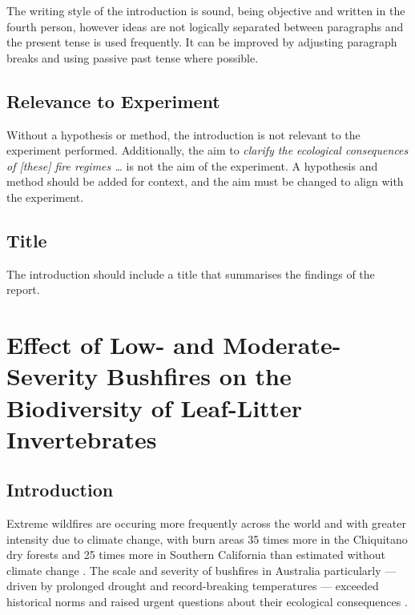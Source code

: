 The writing style of the introduction is sound, being objective and written in the fourth person, however ideas are not logically separated between paragraphs and the present tense is used frequently. It can be improved by adjusting paragraph breaks and using passive past tense where possible.

\subsection{Relevance to Experiment}

Without a hypothesis or method, the introduction is not relevant to the experiment performed. Additionally, the aim to \emph{clarify the ecological consequences of [these] fire regimes \dots} is not the aim of the experiment. A hypothesis and method should be added for context, and the aim must be changed to align with the experiment.

\subsection{Title}

The introduction should include a title that summarises the findings of the report.

\break

\section{Effect of Low- and Moderate-Severity Bushfires on the Biodiversity of Leaf-Litter Invertebrates}

\subsection{Introduction}

Extreme wildfires are occuring more frequently across the world and with greater intensity due to climate change, with burn areas 35 times more in the Chiquitano dry forests and 25 times more in Southern California than estimated without climate change \parencite{kelley-et-al-2025}.
The scale and severity of bushfires in Australia particularly --- driven by prolonged drought and record-breaking temperatures --- exceeded historical norms and raised urgent questions about their ecological consequences \parencite{boer-et-al-2020}.

